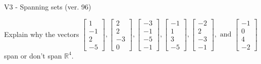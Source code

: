 \begin{exercise}
  \begin{exerciseTitle}V3 - Spanning sets (ver. 96)\end{exerciseTitle}
  \begin{exerciseStatement}
    Explain why the vectors \(\left[\begin{array}{r}
1 \\
-1 \\
2 \\
-5
\end{array}\right] , \left[\begin{array}{r}
2 \\
2 \\
-3 \\
0
\end{array}\right] , \left[\begin{array}{r}
-3 \\
-1 \\
-5 \\
-1
\end{array}\right] , \left[\begin{array}{r}
-1 \\
1 \\
3 \\
-5
\end{array}\right] , \left[\begin{array}{r}
-2 \\
2 \\
-3 \\
-1
\end{array}\right] , \text{ and } \left[\begin{array}{r}
-1 \\
0 \\
4 \\
-2
\end{array}\right]\) span or don't span \(\mathbb{R}^4\). 
	



\end{exerciseStatement}
\end{exercise}
